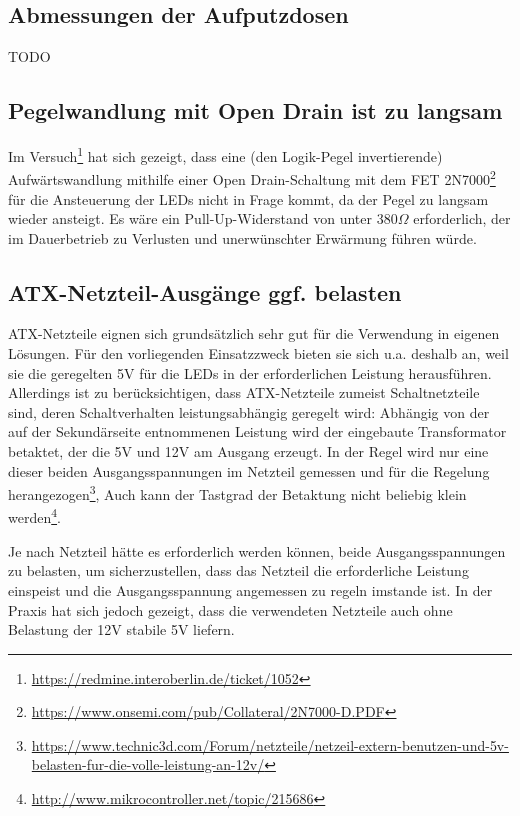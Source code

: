 \subsection{Abmessungen der Aufputzdosen}

TODO

\subsection{Pegelwandlung mit Open Drain ist zu langsam}
Im Versuch\footnote{\url{https://redmine.interoberlin.de/ticket/1052}}
hat sich gezeigt,
dass eine (den Logik-Pegel invertierende) Aufw\"artswandlung
mithilfe einer Open Drain-Schaltung
mit dem FET
2N7000\footnote{\url{https://www.onsemi.com/pub/Collateral/2N7000-D.PDF}}
f\"ur die Ansteuerung der LEDs nicht in Frage kommt,
da der Pegel zu langsam wieder ansteigt.
Es w\"are ein Pull-Up-Widerstand von unter 380$\Omega$ erforderlich,
der im Dauerbetrieb zu Verlusten und
unerw\"unschter Erw\"armung f\"uhren w\"urde.

\subsection{ATX-Netzteil-Ausg\"ange ggf. belasten}
ATX-Netzteile eignen sich grunds\"atzlich sehr gut
f\"ur die Verwendung in eigenen L\"osungen.
F\"ur den vorliegenden Einsatzzweck bieten sie sich u.a. deshalb an,
weil sie die geregelten 5V
f\"ur die LEDs
in der erforderlichen Leistung
herausf\"uhren.
Allerdings ist zu ber\"ucksichtigen,
dass ATX-Netzteile zumeist Schaltnetzteile sind,
deren Schaltverhalten leistungsabh\"angig geregelt wird:
Abhängig von der auf der Sekund\"arseite entnommenen Leistung
wird der eingebaute Transformator betaktet,
der die 5V und 12V am Ausgang erzeugt.
In der Regel wird nur eine dieser beiden Ausgangsspannungen
im Netzteil gemessen und f\"ur die Regelung
herangezogen\footnote{\url{https://www.technic3d.com/Forum/netzteile/netzeil-extern-benutzen-und-5v-belasten-fur-die-volle-leistung-an-12v/}},
Auch kann der Tastgrad der Betaktung nicht beliebig klein
werden\footnote{\url{http://www.mikrocontroller.net/topic/215686}}.

Je nach Netzteil h\"atte es erforderlich werden k\"onnen,
beide Ausgangsspannungen zu belasten,
um sicherzustellen,
dass das Netzteil die erforderliche Leistung einspeist
und die Ausgangsspannung angemessen zu regeln imstande ist.
In der Praxis hat sich jedoch gezeigt,
dass die verwendeten Netzteile
auch ohne Belastung der 12V
stabile 5V liefern.
